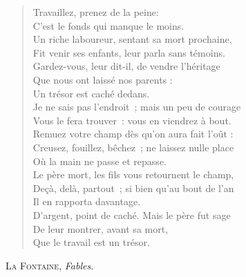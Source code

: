 \documentclass[fontsize=14pt,DIV=calc,a4paper,french]{scrartcl}
\begin{document}
\settowidth{\versewidth}{Un riche laboureur, sentant sa mort prochaine,}

\begin{verse}
\vin Travaillez, prenez de la peine:\\
\vin C'est le fonds\footnotemark{} qui manque le moins.\\
Un riche laboureur, sentant sa mort prochaine,\\
Fit venir ses enfants, leur parla sans témoins.\\
Gardez-vous, leur dit-il, de vendre l'héritage\\
\vin Que nous ont laissé nos parents :\\
\vin Un trésor est caché dedans.\\
Je ne sais pas l'endroit ; mais un peu de courage\\
Vous le fera trouver : vous en viendrez à bout.\\
Remuez votre champ dès qu'on aura fait l'oût :\\
Creusez, fouillez, bêchez ; ne laissez nulle place\\
\vin Où la main ne passe et repasse.\\
Le père mort, les fils vous retournent le champ,\\
Deçà, delà, partout ; si bien qu'au bout de l'an\\
\vin Il en rapporta davantage.\\
D'argent, point de caché. Mais le père fut sage\\
\vin De leur montrer, avant sa mort,\\
\vin Que le travail est un trésor.
\end{verse}

\begin{flushright}
\large
\textsc{La Fontaine}, \textit{Fables}.
\end{flushright}

\end{document}
